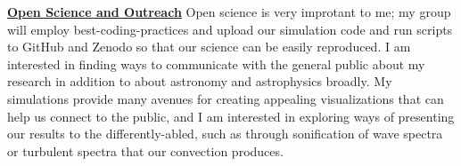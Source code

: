 \documentclass[12pt]{article}
\newcommand{\sct}[1]{\vspace{0.3cm}\hspace{-\parindent}\textbf{\underline{#1}}\hspace{0.3cm}}
\begin{document}
\sct{Open Science and Outreach}
Open science is very improtant to me; my group will employ best-coding-practices and upload our simulation code and run scripts to GitHub and Zenodo so that our science can be easily reproduced.
I am interested in finding ways to communicate with the general public about my research in addition to about astronomy and astrophysics broadly.
My simulations provide many avenues for creating appealing visualizations that can help us connect to the public, and I am interested in exploring ways of presenting our results to the differently-abled, such as through sonification of wave spectra or turbulent spectra that our convection produces.

{\scriptsize

}
\end{document}
